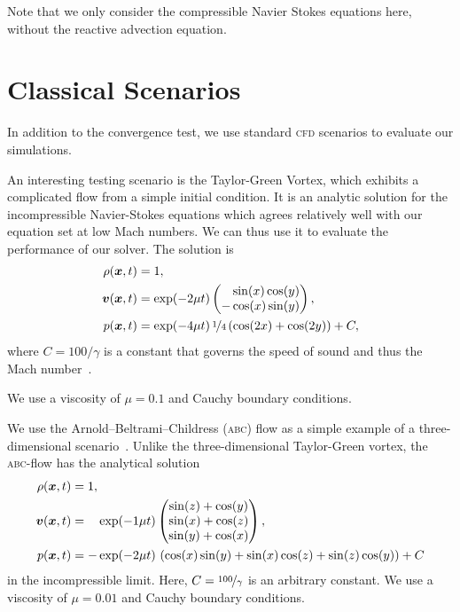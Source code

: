 Note that we only consider the compressible Navier Stokes equations here, without the reactive advection equation.

\section{Classical Scenarios}
In addition to the convergence test, we use standard \textsc{cfd} scenarios to evaluate our simulations.

An interesting testing scenario is the Taylor-Green Vortex, which exhibits a complicated flow from a simple initial condition.
It is an analytic solution for the incompressible Navier-Stokes equations which agrees relatively well with our equation set at low Mach numbers.
We can thus use it to evaluate the performance of our solver.
The solution is
\begin{align}
  \label{eq:taylor-green}
  \begin{split}
  \rho(\bm{x}, t) &= 1,\\
  \bm{v}(\bm{x}, t) &= \exp(-2 \mu t)
  \begin{pmatrix}
    \phantom{-}\sin(x) \cos(y) \\
- \cos(x) \sin(y) 
    \end{pmatrix}, \\
  p(\bm{x}, t) &= \exp(-4 \mu t) \, \nicefrac{1}{4} \left( \cos(2x) + \cos(2y) \right) + C,
  \end{split}
\end{align}
where $C = 100/\gamma$ is a constant that governs the speed of sound and thus the Mach number~\cite{dumbser2016high}.

We use a viscosity of $\mu = 0.1$ and Cauchy boundary conditions.

We use the Arnold–Beltrami–Childress (\textsc{abc}) flow as a simple example of a three-dimensional scenario~\cite{tavelli2016staggered}.
Unlike the three-dimensional Taylor-Green vortex, the \textsc{abc}-flow has the analytical solution
\begin{align}
  \label{eq:abc-flow}
  \begin{split}
  \rho(\bm{x}, t) &= 1,\\
  \bm{v}(\bm{x}, t) &= \phantom{-} \exp(-1\mu t)
  \begin{pmatrix}
    \sin(z) + \cos(y)\\
    \sin(x) + \cos(z)\\
    \sin(y) + \cos(x)
  \end{pmatrix}, \\
  p(\bm{x}, t) &= -\exp(-2 \mu t) \, \left(\cos(x)\sin(y) + \sin(x)\cos(z) + \sin(z)\cos(y)\right)
  + C
  \end{split}
\end{align}
in the incompressible limit.
Here, $C = \nicefrac{100}{\gamma}$ is an arbitrary constant.
We use a viscosity of $\mu = 0.01$ and Cauchy boundary conditions.

